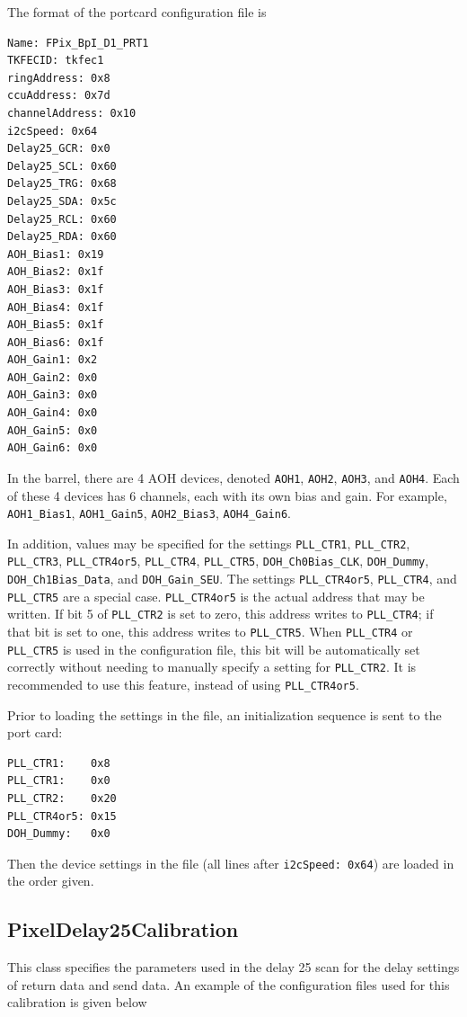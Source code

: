 The format of the portcard configuration file is
\begin{verbatim}
Name: FPix_BpI_D1_PRT1
TKFECID: tkfec1
ringAddress: 0x8
ccuAddress: 0x7d
channelAddress: 0x10
i2cSpeed: 0x64
Delay25_GCR: 0x0
Delay25_SCL: 0x60
Delay25_TRG: 0x68
Delay25_SDA: 0x5c
Delay25_RCL: 0x60
Delay25_RDA: 0x60
AOH_Bias1: 0x19
AOH_Bias2: 0x1f
AOH_Bias3: 0x1f
AOH_Bias4: 0x1f
AOH_Bias5: 0x1f
AOH_Bias6: 0x1f
AOH_Gain1: 0x2
AOH_Gain2: 0x0
AOH_Gain3: 0x0
AOH_Gain4: 0x0
AOH_Gain5: 0x0
AOH_Gain6: 0x0
\end{verbatim}
In the barrel, there are 4 AOH devices, denoted \verb|AOH1|, \verb|AOH2|, \verb|AOH3|, and \verb|AOH4|.  Each of these 4 devices has 6 channels, each with its own bias and gain.  For example, \verb|AOH1_Bias1|, \verb|AOH1_Gain5|, \verb|AOH2_Bias3|, \verb|AOH4_Gain6|.

In addition, values may be specified for the settings \verb|PLL_CTR1|, \verb|PLL_CTR2|, \verb|PLL_CTR3|, \verb|PLL_CTR4or5|, \verb|PLL_CTR4|, \verb|PLL_CTR5|, \verb|DOH_Ch0Bias_CLK|, \verb|DOH_Dummy|, \verb|DOH_Ch1Bias_Data|, and \verb|DOH_Gain_SEU|.  The settings \verb|PLL_CTR4or5|, \verb|PLL_CTR4|, and \verb|PLL_CTR5| are a special case.  \verb|PLL_CTR4or5| is the actual address that may be written.  If bit 5 of \verb|PLL_CTR2| is set to zero, this address writes to \verb|PLL_CTR4|; if that bit is set to one, this address writes to \verb|PLL_CTR5|.  When \verb|PLL_CTR4| or \verb|PLL_CTR5| is used in the configuration file, this bit will be automatically set correctly without needing to manually specify a setting for \verb|PLL_CTR2|.  It is recommended to use this feature, instead of using \verb|PLL_CTR4or5|.

Prior to loading the settings in the file, an initialization sequence is sent to the port card:
\begin{verbatim}
PLL_CTR1:    0x8
PLL_CTR1:    0x0
PLL_CTR2:    0x20
PLL_CTR4or5: 0x15
DOH_Dummy:   0x0
\end{verbatim}
Then the device settings in the file (all lines after \verb|i2cSpeed: 0x64|) are loaded in the order given.

\subsection{PixelDelay25Calibration}

This class specifies the parameters used in the delay 25 scan
for the delay settings of return data and send data. An
example of the configuration files used for this calibration
is given below

